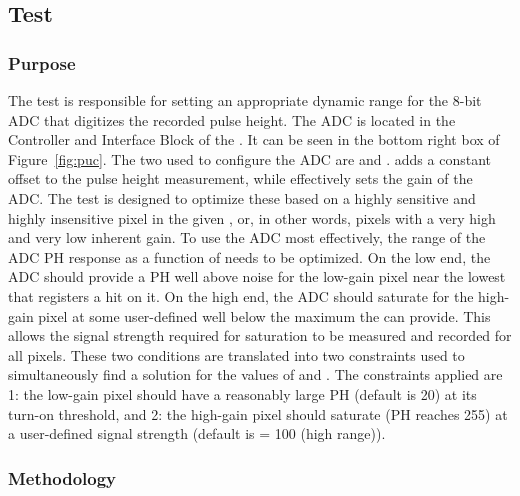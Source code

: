 
\newpage

\subsection{\phopt Test}
\label{ss:phoptimization}

\subsubsection{Purpose}

The \phopt test is responsible for setting an appropriate dynamic range for the 8-bit ADC that digitizes the recorded pulse height.
The ADC is located in the Controller and Interface Block of the \roc.
It can be seen in the bottom right box of Figure~\ref{fig:puc}.
The two \dacs used to configure the ADC are \phoffset and \phscale.
\phoffset adds a constant offset to the pulse height measurement,
while \phscale effectively sets the gain of the ADC.
The \phopt test is designed to optimize these \dacs based on a highly sensitive and highly insensitive pixel in the given \roc, 
or, in other words, pixels with a very high and very low inherent gain.
To use the ADC most effectively, the range of the ADC PH response as a function of \vcal needs to be optimized.
On the low end, the ADC should provide a PH well above noise for the low-gain pixel near the lowest \vcal that registers a hit on it.
On the high end, the ADC should saturate for the high-gain pixel at some user-defined \vcal well below the maximum \vcal the \roc can provide.
This allows the signal strength required for saturation to be measured and recorded for all pixels.
These two conditions are translated into two constraints used to simultaneously find a solution for the values of \phoffset and \phscale.
The constraints applied are 1: the low-gain pixel should have a reasonably large PH (default is 20) at its \vcal turn-on threshold,
and 2: the high-gain pixel should saturate (PH reaches 255) at a user-defined signal strength (default is \vcal = 100 (high range)).

\subsubsection{Methodology}

